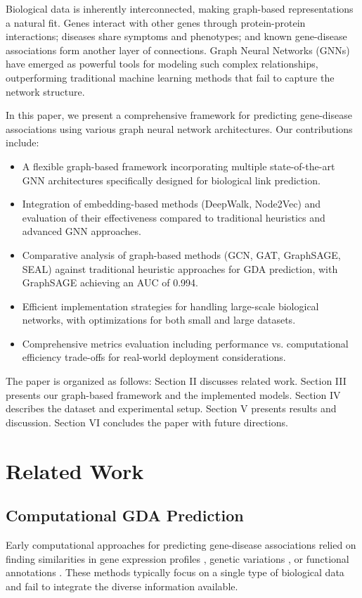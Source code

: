 \documentclass[conference]{IEEEtran}
\begin{document}
Biological data is inherently interconnected, making graph-based representations a natural fit. Genes interact with other genes through protein-protein interactions; diseases share symptoms and phenotypes; and known gene-disease associations form another layer of connections. Graph Neural Networks (GNNs) have emerged as powerful tools for modeling such complex relationships, outperforming traditional machine learning methods that fail to capture the network structure.

In this paper, we present a comprehensive framework for predicting gene-disease associations using various graph neural network architectures. Our contributions include:

\begin{itemize}
\item A flexible graph-based framework incorporating multiple state-of-the-art GNN architectures specifically designed for biological link prediction.
\item Integration of embedding-based methods (DeepWalk, Node2Vec) and evaluation of their effectiveness compared to traditional heuristics and advanced GNN approaches.
\item Comparative analysis of graph-based methods (GCN, GAT, GraphSAGE, SEAL) against traditional heuristic approaches for GDA prediction, with GraphSAGE achieving an AUC of 0.994.
\item Efficient implementation strategies for handling large-scale biological networks, with optimizations for both small and large datasets.
\item Comprehensive metrics evaluation including performance vs. computational efficiency trade-offs for real-world deployment considerations.
\end{itemize}

The paper is organized as follows: Section II discusses related work. Section III presents our graph-based framework and the implemented models. Section IV describes the dataset and experimental setup. Section V presents results and discussion. Section VI concludes the paper with future directions.

\section{Related Work}
\subsection{Computational GDA Prediction}
Early computational approaches for predicting gene-disease associations relied on finding similarities in gene expression profiles \cite{lee2019biobert}, genetic variations \cite{su2020network}, or functional annotations \cite{pinero2020disgenet}. These methods typically focus on a single type of biological data and fail to integrate the diverse information available.
\end{document}
